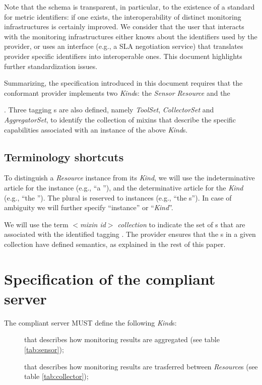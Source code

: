\documentclass[12pt]{article}  %
\begin{document}
Note that the schema is transparent, in particular, to the existence of a standard for metric identifiers: if one exists, the interoperability of distinct monitoring infrastructures is certainly improved. We consider that the user that interacts with the monitoring infrastructures either knows about the identifiers used by the provider, or uses an interface (e.g., a SLA negotiation service) that translates provider specific identifiers into interoperable ones. This document highlights further standardization issues.

Summarizing, the specification introduced in this document requires that the conformant provider implements two {\em Kind}s: the {\em Sensor Resource} and the {\coll. Three tagging \mi s are also defined, namely {\em ToolSet}, {\em CollectorSet} and {\em AggregatorSet}, to identify the collection of mixins that describe the specific capabilities associated with an instance of the above {\em Kind}s. 

\subsection{Terminology shortcuts}

To distinguish a {\em Resource} instance from its {\em Kind}, we will use the indeterminative article for the instance (e.g., ``a \rs''), and the determinative article for the {\em Kind} (e.g., ``the \rs''). The plural is reserved to instances (e.g., ``the \rs s''). In case of ambiguity we will further specify ``instance'' or ``{\em Kind}''. 

We will use the term {\em $<$mixin id$>$ collection} to indicate the set of \mi s that are associated with the identified tagging \mi. The provider ensures that the \mi s in a given collection have defined semantics, as explained in the rest of this paper. 

\section{Specification of the compliant server}

The compliant server MUST define the following {\em Kind}s:

\begin{description}

\item [\sens] that describes how monitoring results are aggregated (see table  \ref{tab:sensor});

\item [\coll] that describes how monitoring results are trasferred between {\em Resource}s (see table \ref{tab:collector});


\end{description}}
\end{document}
